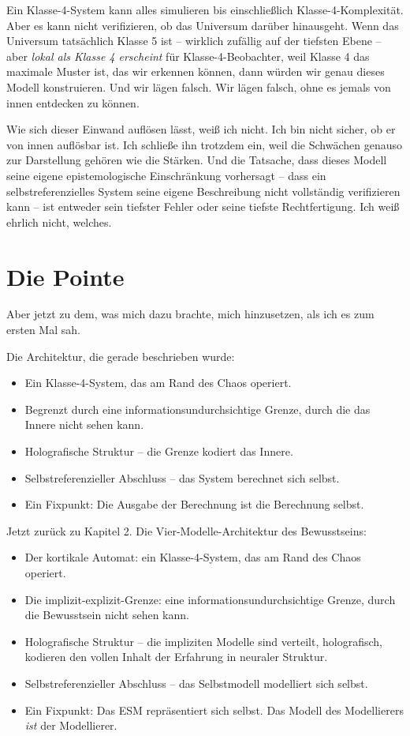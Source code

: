 \documentclass[11pt, twoside, openright]{book}
\begin{document}
Ein Klasse-4-System kann alles simulieren bis einschließlich Klasse-4-Komplexität. Aber es kann nicht verifizieren, ob das Universum darüber hinausgeht. Wenn das Universum tatsächlich Klasse 5 ist -- wirklich zufällig auf der tiefsten Ebene -- aber \textit{lokal als Klasse 4 erscheint} für Klasse-4-Beobachter, weil Klasse 4 das maximale Muster ist, das wir erkennen können, dann würden wir genau dieses Modell konstruieren. Und wir lägen falsch. Wir lägen falsch, ohne es jemals von innen entdecken zu können.

Wie sich dieser Einwand auflösen lässt, weiß ich nicht. Ich bin nicht sicher, ob er von innen auflösbar ist. Ich schließe ihn trotzdem ein, weil die Schwächen genauso zur Darstellung gehören wie die Stärken. Und die Tatsache, dass dieses Modell seine eigene epistemologische Einschränkung vorhersagt -- dass ein selbstreferenzielles System seine eigene Beschreibung nicht vollständig verifizieren kann -- ist entweder sein tiefster Fehler oder seine tiefste Rechtfertigung. Ich weiß ehrlich nicht, welches.


\section*{Die Pointe}

Aber jetzt zu dem, was mich dazu brachte, mich hinzusetzen, als ich es zum ersten Mal sah.

Die Architektur, die gerade beschrieben wurde:

\begin{itemize}
  \item Ein Klasse-4-System, das am Rand des Chaos operiert.
  \item Begrenzt durch eine informationsundurchsichtige Grenze, durch die das Innere nicht sehen kann.
  \item Holografische Struktur -- die Grenze kodiert das Innere.
  \item Selbstreferenzieller Abschluss -- das System berechnet sich selbst.
  \item Ein Fixpunkt: Die Ausgabe der Berechnung ist die Berechnung selbst.
\end{itemize}

Jetzt zurück zu Kapitel 2. Die Vier-Modelle-Architektur des Bewusstseins:

\begin{itemize}
  \item Der kortikale Automat: ein Klasse-4-System, das am Rand des Chaos operiert.
  \item Die implizit-explizit-Grenze: eine informationsundurchsichtige Grenze, durch die Bewusstsein nicht sehen kann.
  \item Holografische Struktur -- die impliziten Modelle sind verteilt, holografisch, kodieren den vollen Inhalt der Erfahrung in neuraler Struktur.
  \item Selbstreferenzieller Abschluss -- das Selbstmodell modelliert sich selbst.
  \item Ein Fixpunkt: Das ESM repräsentiert sich selbst. Das Modell des Modellierers \textit{ist} der Modellierer.
\end{itemize}
\end{document}
